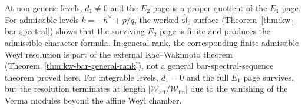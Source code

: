 \begin{remark}\label{rem:bgg-special}
At non-generic levels, $d_1 \neq 0$ and the $E_2$ page is a
proper quotient of the $E_1$ page. For admissible levels
$k = -h^\vee + p/q$, the worked $\widehat{\mathfrak{sl}}_2$ surface
\textup{(}Theorem~\ref{thm:kw-bar-spectral}\textup{)} shows that the
surviving $E_2$ page is finite and produces the admissible
character formula. In general rank, the corresponding finite
admissible Weyl resolution is part of the external
Kac--Wakimoto theorem
\textup{(}Theorem~\ref{thm:kw-bar-general-rank}\textup{)}, not a
general bar-spectral-sequence theorem proved here.
For integrable levels,
$d_1 = 0$ and the full $E_1$ page survives, but the
resolution terminates at length
$|\mathcal{W}_{\mathrm{aff}}/\mathcal{W}_{\mathrm{fin}}|$
due to the vanishing of the Verma modules beyond the
affine Weyl chamber.
\end{remark}


